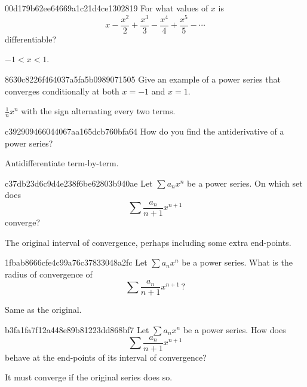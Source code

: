 \begin{note}{00d179b62ee64669a1c21d4ce1302819}
    For what values of \({ x }\) is
    \[
        x - \frac{x^2}{2} + \frac{x^3}{3} - \frac{x^4}{4} + \frac{x^5}{5} - \cdots
    \]
    differentiable?

    \begin{cloze}{1}
        \({ -1 < x < 1 }\).
    \end{cloze}
\end{note}

\begin{note}{8630c8226f464037a5fa5b0989071505}
    Give an example of a power series that converges conditionally at both \({ x = -1 }\) and \({ x = 1 }\).

    \begin{cloze}{1}
        \({ \frac{1}{n} x^{n} }\) with the sign alternating every two terms.
    \end{cloze}
\end{note}

\begin{note}{c392909466044067aa165dcb760bfa64}
    How do you find the antiderivative of a power series?

    \begin{cloze}{1}
        Antidifferentiate term-by-term.
    \end{cloze}
\end{note}

\begin{note}{c37db23d6c9d4e238f6be62803b940ae}
    Let \({ \sum a_n x^{n} }\) be a power series.
    On which set does
    \[
        \sum \frac{a_n}{n+1}x^{n+1}
    \]
    converge?

    \begin{cloze}{1}
        The original interval of convergence, perhaps including some extra end-points.
    \end{cloze}
\end{note}

\begin{note}{1fbab8666cfe4c99a76c37833048a2fc}
    Let \({ \sum a_n x^{n} }\) be a power series.
    What is the radius of convergence of
    \[
        \sum \frac{a_n}{n+1}x^{n+1}\,?
    \]

    \begin{cloze}{1}
        Same as the original.
    \end{cloze}
\end{note}

\begin{note}{b3fa1fa7f12a448e89b81223dd868bf7}
    Let \({ \sum a_n x^{n} }\) be a power series.
    How does
    \[
        \sum \frac{a_n}{n+1}x^{n+1}
    \]
    behave at the end-points of its interval of convergence?

    \begin{cloze}{1}
        It must converge if the original series does so.
    \end{cloze}
\end{note}

